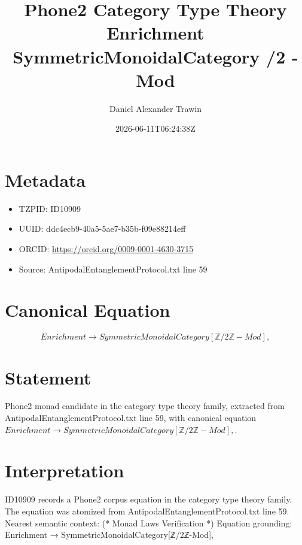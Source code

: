 \documentclass[11pt]{article}
\title{Phone2 Category Type Theory Enrichment SymmetricMonoidalCategory /2 -Mod}
\author{Daniel Alexander Trawin}
\date{2026-06-11T06:24:38Z}
\begin{document}
\maketitle
\section*{Metadata}
\begin{itemize}
\item TZPID: ID10909
\item UUID: ddc4ecb9-40a5-5ae7-b35b-f09e88214eff
\item ORCID: \url{https://orcid.org/0009-0001-4630-3715}
\item Source: AntipodalEntanglementProtocol.txt line 59
\end{itemize}
\section*{Canonical Equation}
\[
Enrichment → SymmetricMonoidalCategory[ℤ/2ℤ-Mod],
\]
\section*{Statement}
Phone2 monad candidate in the category type theory family, extracted from AntipodalEntanglementProtocol.txt line 59, with canonical equation $Enrichment → SymmetricMonoidalCategory[ℤ/2ℤ-Mod],$.
\section*{Interpretation}
ID10909 records a Phone2 corpus equation in the category type theory family. The equation was atomized from AntipodalEntanglementProtocol.txt line 59. Nearest semantic context: (* Monad Laws Verification *) Equation grounding: Enrichment → SymmetricMonoidalCategory[ℤ/2ℤ-Mod],
\end{document}
